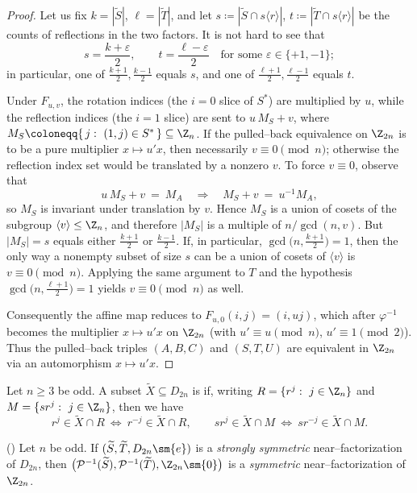 \documentclass{file}
\begin{document}
\begin{proof}
Let us fix $k=|\widetilde S|$, $\ell=|\widetilde T|$, and let
$s\coloneqq |\widetilde S\cap s\langle r\rangle|$, $t\coloneqq |\widetilde T\cap s\langle r\rangle|$
be the counts of reflections in the two factors. 
It is not hard to see that 
\[
s=\frac{k+\varepsilon}{2},\qquad t=\frac{\ell-\varepsilon}{2}
\quad\text{for some }\varepsilon\in\{+1,-1\};
\]
in particular, one of $\frac{k+1}{2},\frac{k-1}{2}$ equals $s$, and one of
$\frac{\ell+1}{2},\frac{\ell-1}{2}$ equals $t$.

Under $F_{u,v}$, the rotation indices (the $i=0$ slice of $S^*$) are multiplied by $u$,
while the reflection indices (the $i=1$ slice) are sent to $u\,M_S+v$, where
$M_S\coloneqq \{\,j:\ (1,j)\in S^*\,\}\subseteq\Z_n$.
If the pulled–back equivalence on $\Z_{2n}$ is to be a pure multiplier $x\mapsto u'x$,
then necessarily $v\equiv 0\pmod n$; otherwise the reflection index set would be
translated by a nonzero $v$. To force $v\equiv 0$, observe that
\[
u\,M_S+v\ =\ M_A\quad\Longrightarrow\quad M_S+v\ =\ u^{-1}M_A,
\]
so $M_S$ is invariant under translation by $v$. Hence $M_S$ is a union of cosets of
the subgroup $\langle v\rangle\le\Z_n$, and therefore $|M_S|$ is a multiple of
$n/\gcd(n,v)$. But $|M_S|=s$ equals either $\tfrac{k+1}{2}$ or $\tfrac{k-1}{2}$.
If, in particular, $\gcd\!\bigl(n,\tfrac{k+1}{2}\bigr)=1$, then the only way a nonempty
subset of size $s$ can be a union of cosets of $\langle v\rangle$ is $v\equiv 0\pmod n$.
Applying the same argument to $T$ and the hypothesis
$\gcd\!\bigl(n,\tfrac{\ell+1}{2}\bigr)=1$ yields $v\equiv 0\pmod n$ as well.

Consequently the affine map reduces to $F_{u,0}(i,j)=(i,uj)$, which after $\varphi^{-1}$
becomes the multiplier $x\mapsto u'x$ on $\Z_{2n}$ (with $u'\equiv u\pmod n$, $u'\equiv 1\pmod 2$).
Thus the pulled–back triples $(A,B,C)$ and $(S,T,U)$ are equivalent in $\Z_{2n}$ via
an automorphism $x\mapsto u'x$.
\end{proof}

\begin{defn}
Let $n\ge 3$ be odd.
A subset $\widetilde X\subseteq D_{2n}$ is  if, writing
$R=\{r^j:\ j\in\Z_n\}$ and $M=\{sr^j:\ j\in\Z_n\}$, then we have
\[
r^j\in \widetilde X\cap R\ \Longleftrightarrow\ r^{-j}\in \widetilde X\cap R,\qquad
sr^j\in \widetilde X\cap M\ \Longleftrightarrow\ sr^{-j}\in \widetilde X\cap M.
\]
\end{defn}

\begin{thm}({\rm \citet[Theorem 8]{KreherPatersonStinson2025}})\label{thm:KPS8}
Let $n$ be odd. If $(\widetilde S,\widetilde T, D_{2n}\sm \{e\})$ is a \emph{strongly symmetric}
near–factorization of $D_{2n}$, then
$\bigl(\mathcal P^{-1}(\widetilde S), \mathcal P^{-1}(\widetilde T),\Z_{2n}\sm \{0\}\bigr)$
is a \emph{symmetric} near–factorization of $\Z_{2n}$.
\end{thm}
\end{document}
